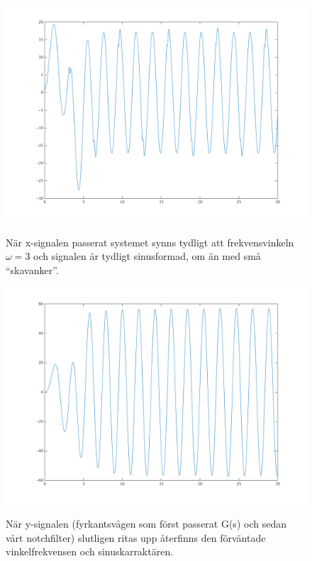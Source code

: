 \begin{figure}
    \caption{När x-signalen passerat systemet synns tydligt att frekvensvinkeln
    $\omega = 3$ och signalen är tydligt sinusformad, om än med små
    ``skavanker''.}
    \centering
    \includegraphics[scale=0.55]{figures/task4e-xsignal-sys2.png}
    \label{fig:task4e-xsignal-sys2}
\end{figure}

\begin{figure}
    \caption{När y-signalen (fyrkantsvågen som först passerat G(s) och sedan
    vårt notchfilter) slutligen ritas upp återfinns den förväntade
    vinkelfrekvensen och sinuskarraktären.}
    \centering
    \includegraphics[scale=0.55]{figures/task4e-y-sys2.png}
    \label{fig:task4e-y-sys2}
\end{figure}
